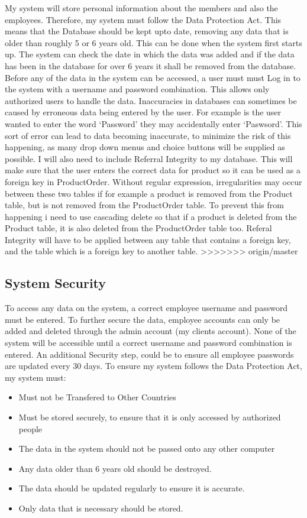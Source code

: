 My system will store personal information about the members and also the employees. Therefore, my system must follow the Data Protection Act. This means that the Database should be kept upto date, removing any data that is older than roughly 5 or 6 years old. This can be done when the system first starts up. The system can check the date in which the data was added and if the data has been in the database for over 6 years it shall be removed from the database. Before any of the data in the system can be accessed, a user must must Log in to the system with a username and password combination. This allows only authorized users to handle the data. Inaccuracies in databases can sometimes be caused by erroneous data being entered by the user. For example is the user wanted to enter the word `Password' they may accidentally enter `Paswsord'. This sort of error can lead to data becoming inaccurate, to minimize the risk of this happening, as many drop down menus and choice buttons will be supplied as possible. I will also need to include Referral Integrity to my database. This will make sure that the user enters the correct data for product so it can be used as a foreign key in ProductOrder. Without regular expression, irregularities may occur between these two tables if for example a product is removed from the Product table, but is not removed from the ProductOrder table. To prevent this from happening i need to use cascading delete so that if a product is deleted from the Product table, it is also deleted from the ProductOrder table too. Referal Integrity will have to be applied between any table that contains a foreign key, and the table which is a foreign key to another table.
>>>>>>> origin/master

\subsection{System Security}
To access any data on the system, a correct employee username and password must be entered. To further secure the data, employee accounts can only be added and deleted through the admin account (my clients account). None of the system will be accessible until a correct username and password combination is entered. An additional Security step, could be to ensure all employee passwords are updated every 30 days. To ensure my system follows the Data Protection Act, my system must: \par \par
\begin{itemize}
\item Must not be Transfered to Other Countries
\item Must be stored securely, to ensure that it is only accessed by authorized people
\item The data in the system should not be passed onto any other computer
\item Any data older than 6 years old should be destroyed.
\item The data should be updated regularly to ensure it is accurate.
\item Only data that is necessary should be stored.
\end{itemize}


